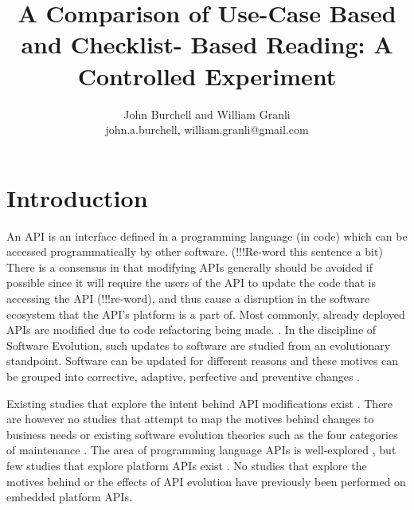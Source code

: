 \documentclass[10pt,twocolumn]{article}
\begin{document}
\title{A Comparison of Use-Case Based and Checklist-
Based Reading: A Controlled Experiment}

\author{John Burchell and William Granli \\
john.a.burchell, william.granli@gmail.com}


\maketitle
\thispagestyle{empty}


\section{Introduction}
An API is an interface defined in a programming language (in code) which can be accessed programmatically by other software. (!!!Re-word this sentence a bit) There is a consensus in that modifying APIs generally should be avoided if possible \cite{google_talk} \cite{mcdonnell2013empirical} \cite{robbes2012developers} \cite{henning2007api} \cite{robbes2012developers} since it will require the users of the API to update the code that is accessing the API (!!!re-word), and thus cause a disruption in the software ecosystem \cite{messerschmitt2005software} that the API's platform is a part of. Most commonly, already deployed APIs are modified due to code refactoring being made. \cite{dig2005role} \cite{xing2006refactoring}. 
In the discipline of Software Evolution, such updates to software are studied from an evolutionary standpoint. Software can be updated for different reasons and these motives can be grouped into corrective, adaptive, perfective and preventive changes \cite{lientz1980software} \cite{iso}. 

Existing studies that explore the intent behind API modifications exist \cite{hou2011exploring}. There are however no studies that attempt to map the motives behind changes to business needs or existing software evolution theories such as the four categories of maintenance \cite{lientz1980software}. The area of programming language APIs is well-explored \cite{hou2011exploring} \cite{shi2011empirical}, but few studies that explore platform APIs exist \cite{robbes2012developers}. No studies that explore the motives behind or the effects of API evolution have previously been performed on embedded platform APIs. 
\end{document}
